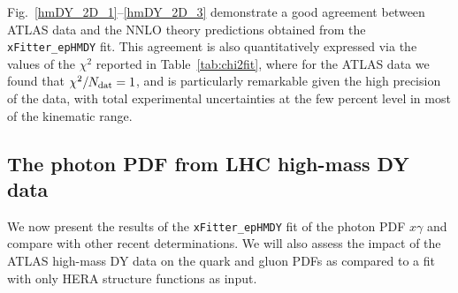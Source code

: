 Fig.~\ref{hmDY_2D_1}--\ref{hmDY_2D_3} demonstrate
a good agreement between ATLAS data and the NNLO theory
predictions obtained from the {\tt xFitter\_epHMDY} fit.
%
This agreement is also quantitatively expressed via the values of the $\chi^2$ reported in
Table~\ref{tab:chi2fit}, where for the ATLAS data we found
that $\chi^2/N_{\rm dat}=1$, and is particularly remarkable
given the high precision of the data, with total experimental
uncertainties at the few percent level in most of the kinematic range.

\subsection{The photon PDF from LHC high-mass DY data}

We now present the results of the {\tt xFitter\_epHMDY}
fit of the photon PDF $x\gamma$ and compare with
other recent determinations. We will also assess the impact
of the ATLAS high-mass DY data on the quark and gluon PDFs as compared
to a fit with only HERA structure functions as input.

